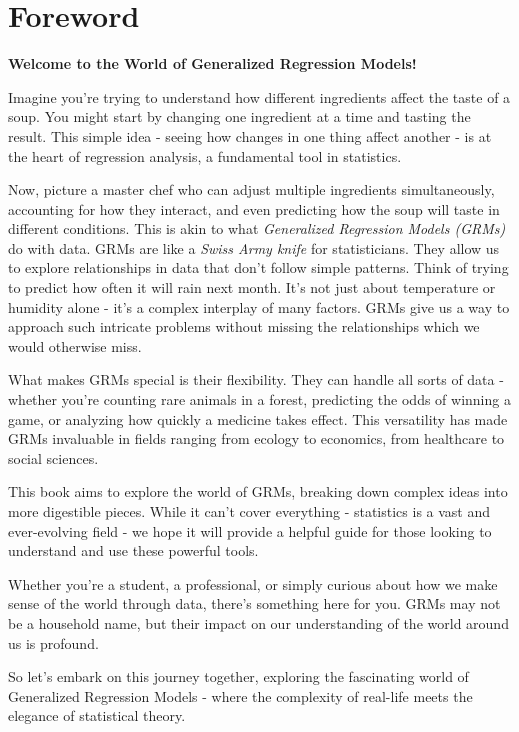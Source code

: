 \chapter*{Foreword}

\begin{center}
{\bf Welcome to the World of Generalized Regression Models!}
\end{center}

Imagine you're trying to understand how different ingredients affect the taste of a soup. You might start by changing one ingredient at a time and tasting the result. This simple idea - seeing how changes in one thing affect another - is at the heart of regression analysis, a fundamental tool in statistics.

Now, picture a master chef who can adjust multiple ingredients simultaneously, accounting for how they interact, and even predicting how the soup will taste in different conditions. This is akin to what \textit{Generalized Regression Models (GRMs)} do with data. GRMs are like a \textit{Swiss Army knife} for statisticians. They allow us to explore relationships in data that don't follow simple patterns. Think of trying to predict how often it will rain next month. It's not just about temperature or humidity alone - it's a complex interplay of many factors. GRMs give us a way to approach such intricate problems without missing the relationships which we would otherwise miss. 

What makes GRMs special is their flexibility. They can handle all sorts of data - whether you're counting rare animals in a forest, predicting the odds of winning a game, or analyzing how quickly a medicine takes effect. This versatility has made GRMs invaluable in fields ranging from ecology to economics, from healthcare to social sciences.  

This book aims to explore the world of GRMs, breaking down complex ideas into more digestible pieces. While it can't cover everything - statistics is a vast and ever-evolving field - we hope it will provide a helpful guide for those looking to understand and use these powerful tools.

Whether you're a student, a professional, or simply curious about how we make sense of the world through data, there's something here for you. GRMs may not be a household name, but their impact on our understanding of the world around us is profound. 

So let's embark on this journey together, exploring the fascinating world of Generalized Regression Models - where the complexity of real-life meets the elegance of statistical theory.
